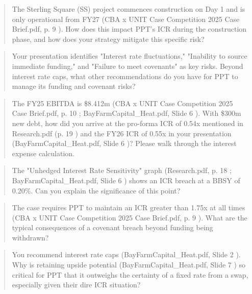 \documentclass[11pt, a4paper, british]{article}
\begin{document}
\newpage

\begin{quote}
    The Sterling Square (SS) project commences construction on Day 1 and is only operational from FY27 (CBA x UNIT Case Competition 2025 Case Brief.pdf, p. 9 ). How does this impact PPT's ICR during the construction phase, and how does your strategy mitigate this specific risk?
\end{quote}

\newpage

\begin{quote}
    Your presentation identifies "Interest rate fluctuations," "Inability to source immediate funding," and "Failure to meet covenants" as key risks. Beyond interest rate caps, what other recommendations do you have for PPT to manage its funding and covenant risks?
\end{quote}

\newpage

\begin{quote}
    The FY25 EBITDA is \$8.412m (CBA x UNIT Case Competition 2025 Case Brief.pdf, p. 10 ; BayFarmCapital_Heat.pdf, Slide 6 ). With \$300m new debt, how did you arrive at the pro-forma ICR of 0.54x mentioned in Research.pdf (p. 19 ) and the FY26 ICR of 0.55x in your presentation (BayFarmCapital_Heat.pdf, Slide 6 )? Please walk through the interest expense calculation.
\end{quote}

\newpage

\begin{quote}
    The "Unhedged Interest Rate Sensitivity" graph (Research.pdf, p. 18 ; BayFarmCapital_Heat.pdf, Slide 6 ) shows an ICR breach at a BBSY of 0.20\%. Can you explain the significance of this point?
\end{quote}

\newpage

\begin{quote}
    The case requires PPT to maintain an ICR greater than 1.75x at all times (CBA x UNIT Case Competition 2025 Case Brief.pdf, p. 9 ). What are the typical consequences of a covenant breach beyond funding being withdrawn?
\end{quote}

\newpage

\begin{quote}
    You recommend interest rate caps (BayFarmCapital_Heat.pdf, Slide 2 ). Why is retaining upside potential (BayFarmCapital_Heat.pdf, Slide 7 ) so critical for PPT that it outweighs the certainty of a fixed rate from a swap, especially given their dire ICR situation?
\end{quote}
\end{document}
